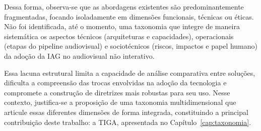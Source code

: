 Dessa forma, observa-se que as abordagens existentes são predominantemente fragmentadas, focando isoladamente em dimensões funcionais, técnicas ou éticas. Não foi identificada, até o momento, uma taxonomia que integre de maneira sistemática os aspectos técnicos (arquiteturas e capacidades), operacionais (etapas do pipeline audiovisual) e sociotécnicos (riscos, impactos e papel humano) da adoção da IAG no audiovisual não interativo.

Essa lacuna estrutural limita a capacidade de análise comparativa entre soluções, dificulta a compreensão das trocas envolvidas na adoção da tecnologia e compromete a construção de diretrizes mais robustas para seu uso. Nesse contexto, justifica-se a proposição de uma taxonomia multidimensional que articule essas diferentes dimensões de forma integrada, constituindo a principal contribuição deste trabalho: a TIGA, apresentada no Capítulo~\ref{cap:taxonomia}.
